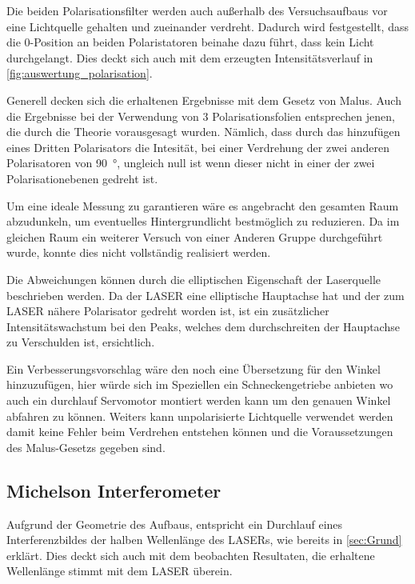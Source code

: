 \documentclass[12pt,english,ngerman]{scrartcl}
\begin{document}
Die beiden Polarisationsfilter werden auch außerhalb des Versuchsaufbaus vor
eine Lichtquelle gehalten und zueinander verdreht. Dadurch wird festgestellt,
dass die 0-Position an beiden Polaristatoren beinahe dazu führt, dass kein
Licht durchgelangt. Dies deckt sich auch mit dem erzeugten Intensitätsverlauf
in \autoref{fig:auswertung_polarisation}.

Generell decken sich die erhaltenen Ergebnisse mit dem Gesetz von Malus. Auch
die Ergebnisse bei der Verwendung von 3 Polarisationsfolien entsprechen jenen,
die durch die Theorie vorausgesagt wurden. Nämlich, dass durch das hinzufügen
eines Dritten Polarisators die Intesität, bei einer Verdrehung der zwei
anderen Polarisatoren von \SI{90}{\degree}, ungleich null ist wenn dieser
nicht in einer der zwei Polarisationebenen gedreht ist.

Um eine ideale Messung zu garantieren wäre es angebracht den gesamten Raum
abzudunkeln, um eventuelles Hintergrundlicht bestmöglich zu reduzieren. Da im
gleichen Raum ein weiterer Versuch von einer Anderen Gruppe durchgeführt wurde,
konnte dies nicht vollständig realisiert werden.

Die Abweichungen können durch die elliptischen Eigenschaft der Laserquelle beschrieben werden.
Da der LASER eine elliptische Hauptachse hat und der zum LASER nähere Polarisator gedreht 
worden ist, ist ein zusätzlicher Intensitätswachstum bei den Peaks, welches dem 
durchschreiten der Hauptachse zu Verschulden ist, ersichtlich.


Ein Verbesserungsvorschlag wäre den noch eine Übersetzung für den Winkel hinzuzufügen,
hier würde sich im Speziellen ein Schneckengetriebe anbieten wo auch ein durchlauf Servomotor
montiert werden kann um den genauen Winkel abfahren zu können.
Weiters kann unpolarisierte Lichtquelle verwendet werden damit keine Fehler beim
Verdrehen entstehen können und die Voraussetzungen des Malus-Gesetzs gegeben sind.


\subsection{Michelson Interferometer}

Aufgrund der Geometrie des Aufbaus, entspricht ein Durchlauf eines
Interferenzbildes der halben Wellenlänge des LASERs, wie bereits in
\autoref{sec:Grund} erklärt. Dies deckt sich auch mit dem beobachten
Resultaten, die erhaltene Wellenlänge stimmt mit dem LASER überein.
\end{document}
